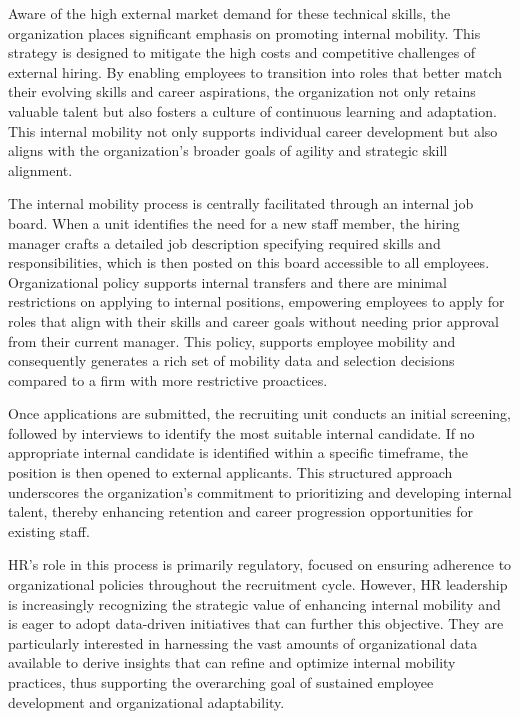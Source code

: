 \documentclass[12pt]{article}
\begin{document}
Aware of the high external market demand for these technical skills, the organization places significant emphasis on promoting internal mobility. This strategy is designed to mitigate the high costs and competitive challenges of external hiring. By enabling employees to transition into roles that better match their evolving skills and career aspirations, the organization not only retains valuable talent but also fosters a culture of continuous learning and adaptation. This internal mobility not only supports individual career development but also aligns with the organization’s broader goals of agility and strategic skill alignment.


The internal mobility process is centrally facilitated through an internal job board. When a unit identifies the need for a new staff member, the hiring manager crafts a detailed job description specifying required skills and responsibilities, which is then posted on this board accessible to all employees. Organizational policy supports internal transfers and there are minimal restrictions on applying to internal positions, empowering employees to apply for roles that align with their skills and career goals without needing prior approval from their current manager. This policy, supports employee mobility and consequently generates a rich set of mobility data and selection decisions compared to a firm with more restrictive proactices.

Once applications are submitted, the recruiting unit conducts an initial screening, followed by interviews to identify the most suitable internal candidate. If no appropriate internal candidate is identified within a specific timeframe, the position is then opened to external applicants. This structured approach underscores the organization's commitment to prioritizing and developing internal talent, thereby enhancing retention and career progression opportunities for existing staff.

HR's role in this process is primarily regulatory, focused on ensuring adherence to organizational policies throughout the recruitment cycle. However, HR leadership is increasingly recognizing the strategic value of enhancing internal mobility and is eager to adopt data-driven initiatives that can further this objective. They are particularly interested in harnessing the vast amounts of organizational data available to derive insights that can refine and optimize internal mobility practices, thus supporting the overarching goal of sustained employee development and organizational adaptability.
\end{document}
